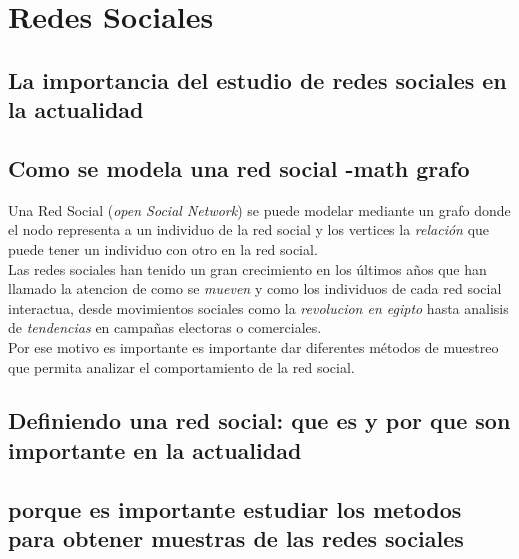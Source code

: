 
\chapter{Redes Sociales} %
\label{Chapter3}


\section{La importancia del estudio de redes sociales en la
  actualidad}
\section{Como se modela  una red social -math grafo}
Una Red Social (\emph{open Social Network}) se puede modelar mediante un grafo
 donde el nodo representa a un individuo de la red social
y los vertices la \emph{relaci\'on} que puede tener un individuo con otro en la
red social.\\


Las redes sociales han tenido un gran crecimiento  en
los \'ultimos a\~nos que han llamado la atencion de como se\emph{ mueven} y como los
individuos de cada red social interactua, desde movimientos sociales como la
\emph{revolucion en egipto}  hasta  analisis de
\emph{tendencias} en campa\~nas electoras o comerciales.\\

Por ese motivo es importante es importante dar diferentes m\'etodos de muestreo
que permita analizar el comportamiento de la red social. 




\section {Definiendo una red social: que es  y por que son importante en
  la actualidad}

\section {porque es importante estudiar los metodos para obtener muestras de
  las redes sociales}
